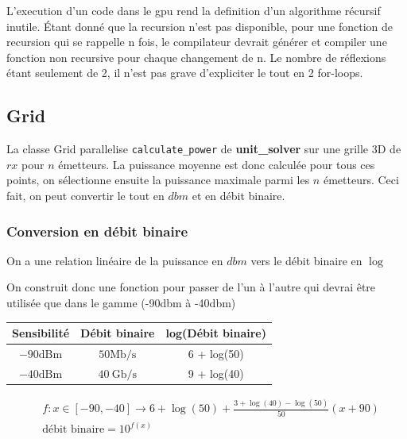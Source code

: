 \documentclass[sn-mathphys-num]{sn-jnl}%
\theoremstyle{thmstyleone}%
\theoremstyle{thmstyletwo}%
\theoremstyle{thmstylethree}%
\begin{document}
\begin{tcolorbox}[colback=red!10!white,colframe=red!50!black,title=Remarque,sharp corners]
    L'execution d'un code dans le gpu rend la definition d'un algorithme récursif inutile.
    Étant donné que la recursion n'est pas disponible, 
    pour une fonction de recursion qui se rappelle n fois, le compilateur
    devrait générer et compiler une fonction non recursive pour chaque changement de n.
    Le nombre de réflexions étant seulement de 2, il n'est pas grave d'expliciter le tout en 2 for-loops.
\end{tcolorbox}

\subsection{Grid}

La classe Grid parallelise \texttt{calculate\_power} de \textbf{unit\_solver} sur une grille 3D de $rx$ pour $n$ émetteurs.
La puissance moyenne est donc calculée pour tous ces points, on sélectionne
ensuite la puissance maximale parmi les $n$ émetteurs. Ceci fait, on peut convertir
le tout en $dbm$ et en débit binaire.

\subsubsection{Conversion en débit binaire}

On a une relation linéaire de la puissance en $dbm$ vers le débit binaire en $\log$

On construit donc une fonction pour passer de l'un à l'autre qui devrai
 être utilisée que dans le gamme (-90dbm à -40dbm)

\begin{table}[H]
\centering
\begin{tabular}{|ccc|}
    \hline Sensibilité & Débit binaire & log(Débit binaire) \\
    \hline$-90 \mathrm{dBm}$ & $50 \mathrm{Mb} / \mathrm{s}$ & 6 + log(50) \\
    \hline$-40 \mathrm{dBm}$ & $40 \mathrm{~Gb} / \mathrm{s}$ & 9 + log(40) \\
    \hline
\end{tabular}
\end{table}

\begin{align*}
    &f \colon x \in [-90, -40] \longrightarrow 6 + \log(50) + \frac{3 + \log(40) - \log(50)}{50} (x + 90)\\
    &\text{débit binaire} = 10^{f(x)}
\end{align*}
\end{document}
